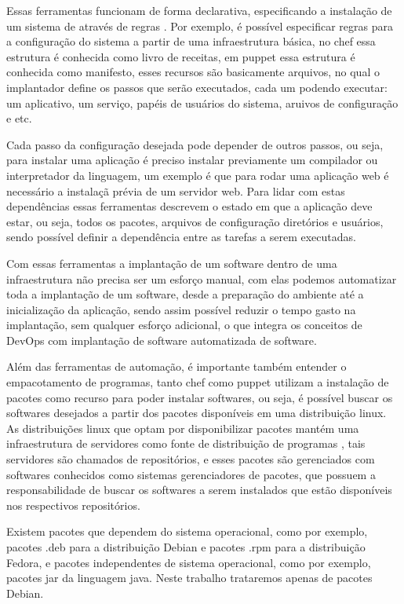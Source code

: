 Essas ferramentas funcionam de forma declarativa, especificando a instalação de um sistema de
através de regras \cite{6265084}. Por exemplo, é possível especificar regras para a configuração do sistema
a partir de uma infraestrutura básica, no chef essa estrutura é conhecida como livro
de receitas, em puppet essa estrutura é conhecida como manifesto, esses recursos
são basicamente arquivos, no qual o implantador define os passos que serão executados,
cada um podendo executar: um aplicativo, um serviço, papéis de usuários do sistema,
aruivos de configuração e etc.

Cada passo da configuração desejada pode depender de outros passos, ou seja, para
instalar uma aplicação é preciso instalar previamente um compilador ou interpretador da linguagem,
um exemplo é que para rodar uma aplicação web é necessário a instalaçã prévia de
um servidor web. Para lidar com estas dependências essas ferramentas descrevem o estado em que a aplicação
deve estar, ou seja, todos os pacotes, arquivos de configuração diretórios e usuários,
sendo possível definir a dependência entre as tarefas a serem executadas.

Com essas ferramentas a implantação de um software dentro de uma infraestrutura
não precisa ser um esforço manual, com elas podemos automatizar toda a implantação
de um software, desde a preparação do ambiente até a inicialização da aplicação,
sendo assim possível reduzir o tempo gasto na implantação, sem qualquer esforço
adicional, o que integra os conceitos de DevOps com implantação de software automatizada
de software.

Além das ferramentas de automação, é importante também entender o empacotamento de
programas, tanto chef como puppet utilizam a instalação de pacotes como recurso para
poder instalar softwares, ou seja, é possível buscar os softwares desejados a partir
dos pacotes disponíveis em uma distribuição linux. As distribuições linux que
optam por disponibilizar pacotes mantém uma infraestrutura de servidores como fonte
de distribuição de programas \cite{araujo2011apprecommender}, tais servidores são
chamados de repositórios, e esses pacotes são gerenciados com softwares conhecidos
como sistemas gerenciadores de pacotes, que possuem a responsabilidade de buscar
os softwares a serem instalados que estão disponíveis nos respectivos repositórios.

Existem pacotes que dependem do sistema operacional, como por exemplo, pacotes .deb
para a distribuição Debian e pacotes .rpm para a distribuição Fedora, e
pacotes independentes de sistema operacional, como por exemplo, pacotes jar da
linguagem java. Neste trabalho trataremos apenas de pacotes Debian.

